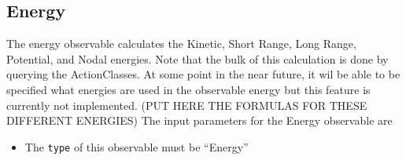 \documentclass{book}
\begin{document}
\subsection{Energy}
The energy observable calculates the Kinetic, Short Range, Long Range,
Potential, and Nodal energies. Note that the bulk of this calculation
is done by querying the ActionClasses. At some point in the near
future, it wil be able to be specified what energies are used in the
observable energy but this feature is currently not implemented.  (PUT
HERE THE FORMULAS FOR THESE DIFFERENT ENERGIES) 
The input parameters for the Energy observable are 
\begin{itemize}
\item The \texttt{type} of this observable must be ``Energy''
\end{itemize}
\end{document}
